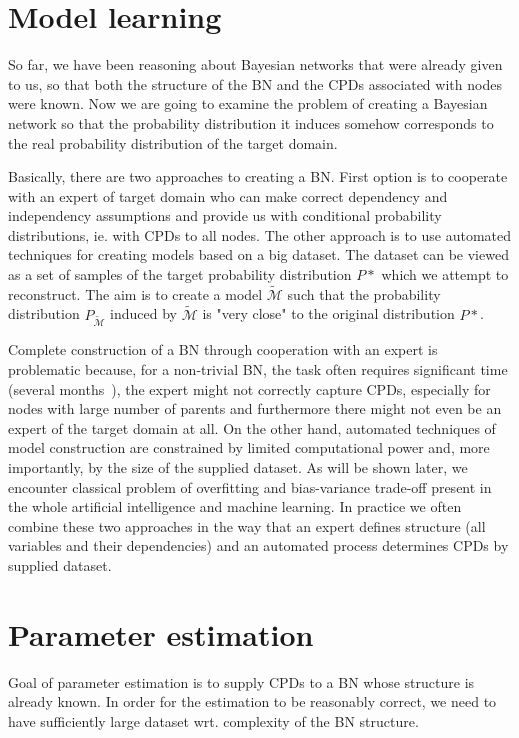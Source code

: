 \documentclass[english,cover]{fitthesis} %
\newcommand{\todo}[1]{{\color{red}#1}}
\begin{document}
\section{Model learning}
So far, we have been reasoning about Bayesian networks that were already given to us, so that both the structure of the BN and the CPDs associated with nodes were known. Now we are going to examine the problem of creating a Bayesian network so that the probability distribution it induces somehow corresponds to the real probability distribution of the target domain.

Basically, there are two approaches to creating a BN. First option is to cooperate with an expert of target domain who can make correct dependency and independency assumptions and provide us with conditional probability distributions, ie. with CPDs to all nodes. The other approach is to use automated techniques for creating models based on a big dataset. The dataset can be viewed as a set of samples of the target probability distribution $P*$ which we attempt to reconstruct. The aim is to create a model $\tilde{\mathcal{M}}$ such that the probability distribution $P_{\tilde{\mathcal{M}}}$ induced by $\tilde{\mathcal{M}}$ is "very close" to the original distribution $P*$.

Complete construction of a BN through cooperation with an expert is problematic because, for a non-trivial BN, the task often requires significant time (several months~\cite{pgm}), the expert might not correctly capture CPDs, especially for nodes with large number of parents and furthermore there might not even be an expert of the target domain at all. On the other hand, automated techniques of model construction are constrained by limited computational power and, more importantly, by the size of the supplied dataset. As will be shown later, we encounter classical problem of overfitting and bias-variance trade-off present in the whole artificial intelligence and machine learning. In practice we often combine these two approaches in the way that an expert defines structure (all variables and their dependencies) and an automated process determines CPDs by supplied dataset.


\section{Parameter estimation}
Goal of parameter estimation is to supply CPDs to a BN whose structure is already known. In order for the estimation to be reasonably correct, we need to have sufficiently large dataset wrt. complexity of the BN structure.
\end{document}
